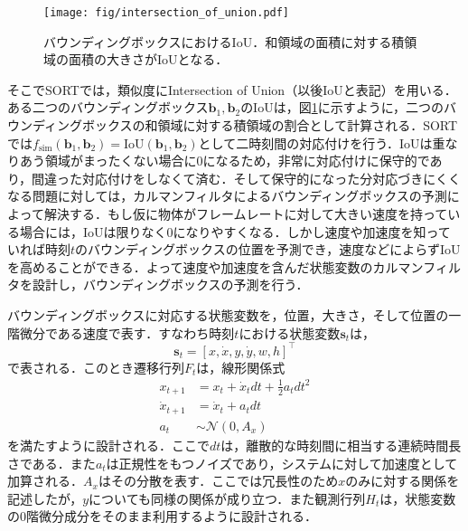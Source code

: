     \begin{figure}[t]
        \centering
        \texttt{[image: fig/intersection\_of\_union.pdf]}
        \caption[バウンディングボックスにおけるIoU]{バウンディングボックスにおけるIoU．和領域の面積に対する積領域の面積の大きさがIoUとなる．}
        \label{fig:intersection_of_union}
    \end{figure}

    そこでSORTでは，類似度にIntersection of Union（以後IoUと表記）を用いる．ある二つのバウンディングボックス$\bm{b}_1, \bm{b}_2$のIoUは，図\ref{fig:intersection_of_union}に示すように，二つのバウンディングボックスの和領域に対する積領域の割合として計算される．SORTでは$f_{\text{sim}}(\bm{b}_1, \bm{b}_2) = \text{IoU}(\bm{b}_1, \bm{b}_2)$として二時刻間の対応付けを行う．IoUは重なりあう領域がまったくない場合に$0$になるため，非常に対応付けに保守的であり，間違った対応付けをしなくて済む．そして保守的になった分対応づきにくくなる問題に対しては，カルマンフィルタによるバウンディングボックスの予測によって解決する．もし仮に物体がフレームレートに対して大きい速度を持っている場合には，IoUは限りなく0になりやすくなる．しかし速度や加速度を知っていれば時刻$t$のバウンディングボックスの位置を予測でき，速度などによらずIoUを高めることができる．よって速度や加速度を含んだ状態変数のカルマンフィルタを設計し，バウンディングボックスの予測を行う．

    バウンディングボックスに対応する状態変数を，位置，大きさ，そして位置の一階微分である速度で表す．すなわち時刻$t$における状態変数$\bm{s}_t$は，
    \begin{equation}
        \label{eq:sort_state_vector}
        \bm{s}_t = \left[x, \dot{x}, y, \dot{y}, w, h\right]^{\top}
    \end{equation}
    で表される．このとき遷移行列$F_t$は，線形関係式
    \begin{equation}
        \label{eq:sort_transition}
        \begin{aligned}
            x_{t+1} &= x_t + \dot{x}_t dt + \frac{1}{2} a_t dt^2
            \\\dot{x}_{t+1} &= \dot{x}_t + a_t dt
            \\a_t &\sim \mathcal{N}(0, A_x)
        \end{aligned}
    \end{equation}
    を満たすように設計される．ここで$dt$は，離散的な時刻間に相当する連続時間長さである．また$a_t$は正規性をもつノイズであり，システムに対して加速度として加算される．$A_x$はその分散を表す．ここでは冗長性のため$x$のみに対する関係を記述したが，$y$についても同様の関係が成り立つ．また観測行列$H_t$は，状態変数の$0$階微分成分をそのまま利用するように設計される．

